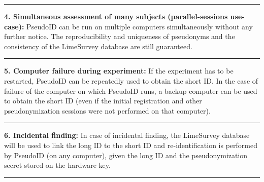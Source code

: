 \par\noindent\rule{\textwidth\color{pniblue}}{0.4pt}
\textbf{4. Simultaneous assessment of many subjects (parallel-sessions use-case):}
PseudoID can be run on multiple computers simultaneously without any further notice. The reproducibility and uniqueness of pseudonyms and the consistency of the LimeSurvey database are still guaranteed.

\par\noindent\rule{\textwidth\color{pniblue}}{0.4pt}
\textbf{5. Computer failure during experiment:}
If the experiment has to be restarted, PseudoID can be repeatedly used to obtain the short ID. In the case of failure of the computer on which PseudoID runs, a backup computer can be used to obtain the short ID (even if the initial registration and other pseudonymization sessions were not performed on that computer).

\par\noindent\rule{\textwidth\color{pniblue}}{0.4pt}
\textbf{6. Incidental finding:} In case of incidental finding, the LimeSurvey database will be used to link the long ID to the short ID and re-identification is performed by PseudoID (on any computer), given the long ID and the pseudonymization secret stored on the hardware key. 

\par\noindent\rule{\textwidth\color{pniblue}}{0.4pt}
